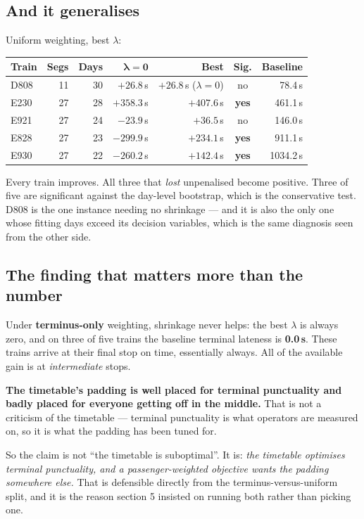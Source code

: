 \documentclass[11pt,a4paper]{article}
\begin{document}
\subsection*{And it generalises}

Uniform weighting, best $\lambda$:

\begin{center}
\small
\begin{tabular}{@{}lrrrrc r@{}}
\toprule
\textbf{Train} & \textbf{Segs} & \textbf{Days} & $\boldsymbol{\lambda=0}$ & \textbf{Best} & \textbf{Sig.} & \textbf{Baseline} \\
\midrule
D808 & 11 & 30 & $+26.8$\,s & $+26.8$\,s ($\lambda=0$) & no & 78.4\,s \\
E230 & 27 & 28 & $+358.3$\,s & $\mathbf{+407.6}$\,s & \textbf{yes} & 461.1\,s \\
E921 & 27 & 24 & $-23.9$\,s & $+36.5$\,s & no & 146.0\,s \\
E828 & 27 & 23 & $-299.9$\,s & $\mathbf{+234.1}$\,s & \textbf{yes} & 911.1\,s \\
E930 & 27 & 22 & $-260.2$\,s & $\mathbf{+142.4}$\,s & \textbf{yes} & 1034.2\,s \\
\bottomrule
\end{tabular}
\end{center}

\noindent Every train improves. All three that \emph{lost} unpenalised become positive.
Three of five are significant against the day-level bootstrap, which is the conservative
test. D808 is the one instance needing no shrinkage --- and it is also the only one whose
fitting days exceed its decision variables, which is the same diagnosis seen from the other
side.

\subsection*{The finding that matters more than the number}

Under \textbf{terminus-only} weighting, shrinkage never helps: the best $\lambda$ is always
zero, and on three of five trains the baseline terminal lateness is \textbf{0.0\,s}. These
trains arrive at their final stop on time, essentially always. All of the available gain is
at \emph{intermediate} stops.

\begin{keybox}
\textbf{The timetable's padding is well placed for terminal punctuality and badly placed for
everyone getting off in the middle.} That is not a criticism of the timetable --- terminal
punctuality is what operators are measured on, so it is what the padding has been tuned for.

So the claim is not ``the timetable is suboptimal''. It is: \emph{the timetable optimises
terminal punctuality, and a passenger-weighted objective wants the padding somewhere else.}
That is defensible directly from the terminus-versus-uniform split, and it is the reason
section 5 insisted on running both rather than picking one.
\end{keybox}
\end{document}
